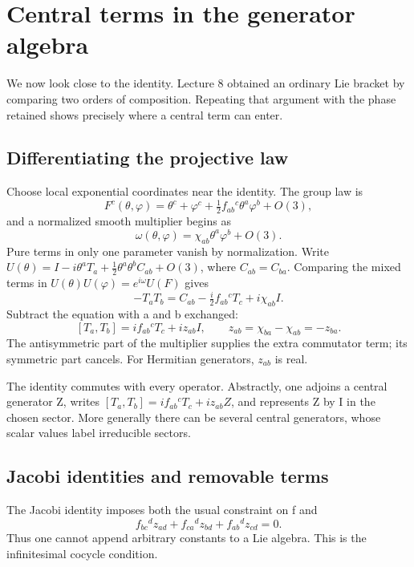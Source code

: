 \documentclass[11pt]{article}
\begin{document}
\section{Central terms in the generator algebra}
\label{sec:central}
We now look close to the identity. Lecture 8 obtained an ordinary Lie
bracket by comparing two orders of composition. Repeating that argument
with the phase retained shows precisely where a central term can enter.

\subsection{Differentiating the projective law}
Choose local exponential coordinates near the identity. The group law is
\[
 F^c(\theta,\varphi)=\theta^c+\varphi^c+
 \tfrac12 f_{ab}{}^c\theta^a\varphi^b+O(3),
\]
and a normalized smooth multiplier begins as
\begin{equation}
 \omega(\theta,\varphi)=\chi_{ab}\theta^a\varphi^b+O(3).
 \label{eq:local-multiplier}
\end{equation}
Pure terms in only one parameter vanish by normalization. Write
\(U(\theta)=I-i\theta^aT_a+\tfrac12\theta^a\theta^bC_{ab}+O(3)\),
where \(C_{ab}=C_{ba}\). Comparing the mixed terms in
\(U(\theta)U(\varphi)=e^{i\omega}U(F)\) gives
\[
 -T_aT_b=C_{ab}-\tfrac i2 f_{ab}{}^cT_c+i\chi_{ab}I.
\]
Subtract the equation with a and b exchanged:
\begin{equation}
 \boxed{[T_a,T_b]=if_{ab}{}^cT_c+iz_{ab}I},
 \qquad z_{ab}=\chi_{ba}-\chi_{ab}=-z_{ba}.
 \label{eq:central-algebra}
\end{equation}
The antisymmetric part of the multiplier supplies the extra commutator
term; its symmetric part cancels. For Hermitian generators,
\(z_{ab}\) is real.

The identity commutes with every operator. Abstractly, one adjoins a
central generator Z, writes
\([T_a,T_b]=if_{ab}{}^cT_c+iz_{ab}Z\), and represents Z by I in the
chosen sector. More generally there can be several central generators,
whose scalar values label irreducible sectors.

\subsection{Jacobi identities and removable terms}
The Jacobi identity imposes both the usual constraint on f and
\begin{equation}
 f_{bc}{}^d z_{ad}+f_{ca}{}^d z_{bd}+f_{ab}{}^d z_{cd}=0.
 \label{eq:central-jacobi}
\end{equation}
Thus one cannot append arbitrary constants to a Lie algebra. This is the
infinitesimal cocycle condition.
\end{document}
